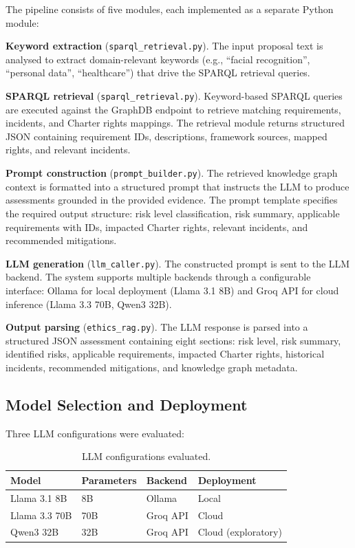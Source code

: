 The pipeline consists of five modules, each implemented as a separate Python module:

\textbf{Keyword extraction} (\texttt{sparql\_retrieval.py}). The input proposal text is analysed to extract domain-relevant keywords (e.g., ``facial recognition'', ``personal data'', ``healthcare'') that drive the SPARQL retrieval queries.

\textbf{SPARQL retrieval} (\texttt{sparql\_retrieval.py}). Keyword-based SPARQL queries are executed against the GraphDB endpoint to retrieve matching requirements, incidents, and Charter rights mappings. The retrieval module returns structured JSON containing requirement IDs, descriptions, framework sources, mapped rights, and relevant incidents.

\textbf{Prompt construction} (\texttt{prompt\_builder.py}). The retrieved knowledge graph context is formatted into a structured prompt that instructs the LLM to produce assessments grounded in the provided evidence. The prompt template specifies the required output structure: risk level classification, risk summary, applicable requirements with IDs, impacted Charter rights, relevant incidents, and recommended mitigations.

\textbf{LLM generation} (\texttt{llm\_caller.py}). The constructed prompt is sent to the LLM backend. The system supports multiple backends through a configurable interface: Ollama for local deployment (Llama 3.1 8B) and Groq API for cloud inference (Llama 3.3 70B, Qwen3 32B).

\textbf{Output parsing} (\texttt{ethics\_rag.py}). The LLM response is parsed into a structured JSON assessment containing eight sections: risk level, risk summary, identified risks, applicable requirements, impacted Charter rights, historical incidents, recommended mitigations, and knowledge graph metadata.


\subsection{Model Selection and Deployment}

Three LLM configurations were evaluated:

\begin{table}[htbp]
\centering
\caption{LLM configurations evaluated.}
\label{tab:models}
\begin{tabular}{llll}
\toprule
\textbf{Model} & \textbf{Parameters} & \textbf{Backend} & \textbf{Deployment} \\
\midrule
Llama 3.1 8B & 8B & Ollama & Local \\
Llama 3.3 70B & 70B & Groq API & Cloud \\
Qwen3 32B & 32B & Groq API & Cloud (exploratory) \\
\bottomrule
\end{tabular}
\end{table}

